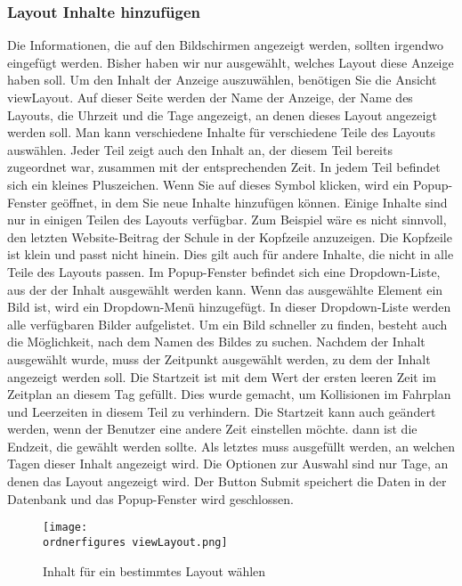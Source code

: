 \subsubsection{Layout Inhalte hinzufügen}
Die Informationen, die auf den Bildschirmen angezeigt werden, sollten irgendwo eingefügt werden. Bisher haben wir nur ausgewählt, welches Layout diese Anzeige haben soll.
Um den Inhalt der Anzeige auszuwählen, benötigen Sie die Ansicht viewLayout. Auf dieser Seite werden der Name der Anzeige, der Name des Layouts, die Uhrzeit und die Tage angezeigt, an denen dieses Layout angezeigt werden soll.
Man kann verschiedene Inhalte für verschiedene Teile des Layouts auswählen.
Jeder Teil zeigt auch den Inhalt an, der diesem Teil bereits zugeordnet war, zusammen mit der entsprechenden Zeit.
In jedem Teil befindet sich ein kleines Pluszeichen. Wenn Sie auf dieses Symbol klicken, wird ein Popup-Fenster geöffnet, in dem Sie neue Inhalte hinzufügen können.
Einige Inhalte sind nur in einigen Teilen des Layouts verfügbar. Zum Beispiel wäre es nicht sinnvoll, den letzten Website-Beitrag der Schule in der Kopfzeile anzuzeigen. Die Kopfzeile ist klein und passt nicht hinein. Dies gilt auch für andere Inhalte, die nicht in alle Teile des Layouts passen.
Im Popup-Fenster befindet sich eine Dropdown-Liste, aus der der Inhalt ausgewählt werden kann. Wenn das ausgewählte Element ein Bild ist, wird ein Dropdown-Menü hinzugefügt. In dieser Dropdown-Liste werden alle verfügbaren Bilder aufgelistet. Um ein Bild schneller zu finden, besteht auch die Möglichkeit, nach dem Namen des Bildes zu suchen.
Nachdem der Inhalt ausgewählt wurde, muss der Zeitpunkt ausgewählt werden, zu dem der Inhalt angezeigt werden soll. Die Startzeit ist mit dem Wert der ersten leeren Zeit im Zeitplan an diesem Tag gefüllt. Dies wurde gemacht, um Kollisionen im Fahrplan und Leerzeiten in diesem Teil zu verhindern. Die Startzeit kann auch geändert werden, wenn der Benutzer eine andere Zeit einstellen möchte. dann ist die Endzeit, die gewählt werden sollte.
Als letztes muss ausgefüllt werden, an welchen Tagen dieser Inhalt angezeigt wird. Die Optionen zur Auswahl sind nur Tage, an denen das Layout angezeigt wird.
Der Button Submit speichert die Daten in der Datenbank und das Popup-Fenster wird geschlossen.

\begin{figure}[H]
	\centering
	\texttt{[image: \\ordnerfigures viewLayout.png]}
	\caption{Inhalt für ein bestimmtes Layout wählen}
	\label{fi:viewLayout}
\end{figure}

